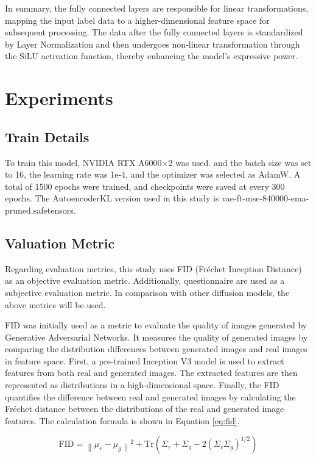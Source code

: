 \documentclass[12pt]{report}
\begin{document}
In summary, the fully connected layers are responsible for linear transformations, mapping the input label data to a higher-dimensional feature space for subsequent processing. The data after the fully connected layers is standardized by Layer Normalization and then undergoes non-linear transformation through the SiLU activation function, thereby enhancing the model's expressive power.


\chapter{Experiments}
\section{Train Details }
To train this model, NVIDIA RTX A6000$\times$2 was used. and the batch size was set to 16, the learning rate was 1e-4, and the optimizer was selected as AdamW. A total of 1500 epochs were trained, and checkpoints were saved at every 300 epochs. The AutoencoderKL version used in this study is vae-ft-mse-840000-ema-pruned.safetensors.
\section{Valuation Metric}\label{chap:ValuationMetric}
Regarding evaluation metrics, this study uses FID (Fréchet Inception Distance) \cite{FID} as an objective evaluation metric. Additionally, questionnaire are used as a subjective evaluation metric. In comparison with other diffusion models, the above metrics will be used.

FID was initially used as a metric to evaluate the quality of images generated by Generative Adversarial Networks. It measures the quality of generated images by comparing the distribution differences between generated images and real images in feature space. First, a pre-trained Inception V3 model is used to extract features from both real and generated images. The extracted features are then represented as distributions in a high-dimensional space. Finally, the FID quantifies the difference between real and generated images by calculating the Fréchet distance between the distributions of the real and generated image features. The calculation formula is shown in Equation \ref{eq:fid}.

\begin{equation} \label{eq:fid}
\text{FID} = \left\| \mu_r - \mu_g \right\|^2 + \text{Tr}\left( \Sigma_r + \Sigma_g - 2(\Sigma_r\Sigma_g)^{1/2} \right)
\end{equation}
\end{document}
